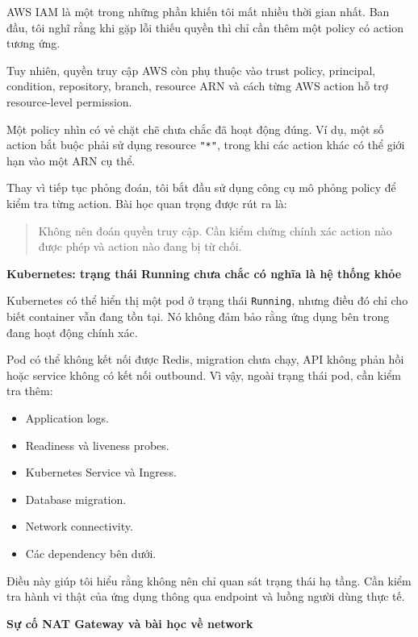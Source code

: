 AWS IAM là một trong những phần khiến tôi mất nhiều thời gian nhất. Ban
đầu, tôi nghĩ rằng khi gặp lỗi thiếu quyền thì chỉ cần thêm một policy
có action tương ứng.

Tuy nhiên, quyền truy cập AWS còn phụ thuộc vào trust policy, principal,
condition, repository, branch, resource ARN và cách từng AWS action hỗ
trợ resource-level permission.

Một policy nhìn có vẻ chặt chẽ chưa chắc đã hoạt động đúng. Ví dụ, một
số action bắt buộc phải sử dụng resource \texttt{"*"}, trong khi các
action khác có thể giới hạn vào một ARN cụ thể.

Thay vì tiếp tục phỏng đoán, tôi bắt đầu sử dụng công cụ mô phỏng policy
để kiểm tra từng action. Bài học quan trọng được rút ra là:

\begin{quote}
Không nên đoán quyền truy cập. Cần kiểm chứng chính xác action nào được
phép và action nào đang bị từ chối.
\end{quote}

\vspace{0.5em}\noindent\textbf{Kubernetes: trạng thái Running chưa chắc có nghĩa là hệ
thống
khỏe}\par

Kubernetes có thể hiển thị một pod ở trạng thái \texttt{Running}, nhưng
điều đó chỉ cho biết container vẫn đang tồn tại. Nó không đảm bảo rằng
ứng dụng bên trong đang hoạt động chính xác.

Pod có thể không kết nối được Redis, migration chưa chạy, API không phản
hồi hoặc service không có kết nối outbound. Vì vậy, ngoài trạng thái
pod, cần kiểm tra thêm:

\begin{itemize}
\tightlist
\item
  Application logs.
\item
  Readiness và liveness probes.
\item
  Kubernetes Service và Ingress.
\item
  Database migration.
\item
  Network connectivity.
\item
  Các dependency bên dưới.
\end{itemize}

Điều này giúp tôi hiểu rằng không nên chỉ quan sát trạng thái hạ tầng.
Cần kiểm tra hành vi thật của ứng dụng thông qua endpoint và luồng người
dùng thực tế.

\vspace{0.5em}\noindent\textbf{Sự cố NAT Gateway và bài học về
network}\par

